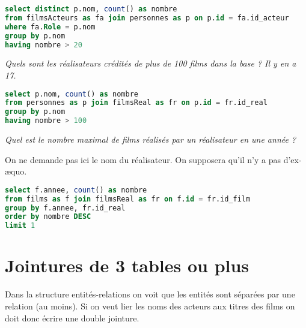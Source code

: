 \begin{Answer}
\begin{lstlisting}[language=SQL]
select distinct p.nom, count() as nombre
from filmsActeurs as fa join personnes as p on p.id = fa.id_acteur
where fa.Role = p.nom
group by p.nom
having nombre > 20
\end{lstlisting}
\end{Answer}
\begin{Exercise}[label = qu:centfilms] \it Quels sont les réalisateurs crédités de plus de 100 films dans la base ? Il y en a 17.
\end{Exercise}
\begin{Answer}
\begin{lstlisting}[language=SQL]
select p.nom, count() as nombre
from personnes as p join filmsReal as fr on p.id = fr.id_real
group by p.nom
having nombre > 100
\end{lstlisting}
\end{Answer}
\begin{Exercise}[label = qu:realMax]\it Quel est le nombre maximal de films réalisés par un réalisateur en une année ? 

On ne demande pas ici le nom du réalisateur. On supposera qu'il n'y a pas d'ex-æquo.
\end{Exercise}
\begin{Answer}
\begin{lstlisting}[language=SQL]
select f.annee, count() as nombre
from films as f join filmsReal as fr on f.id = fr.id_film
group by f.annee, fr.id_real
order by nombre DESC
limit 1
\end{lstlisting}
\newpage
\end{Answer}
\newpage
\section{Jointures de 3 tables ou plus}
Dans la structure entités-relations on voit que les entités sont séparées par une relation (au moins). Si on veut lier les noms des acteurs aux titres des films on doit donc écrire une double jointure.

